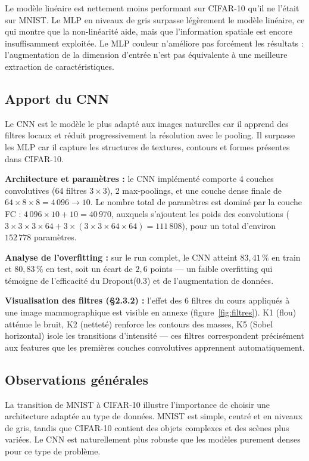 \documentclass[a4paper,10pt]{article}
\begin{document}
Le modèle linéaire est nettement moins performant sur CIFAR-10 qu'il ne l'était sur MNIST.
Le MLP en niveaux de gris surpasse légèrement le modèle linéaire, ce qui montre que
la non-linéarité aide, mais que l'information spatiale est encore insuffisamment exploitée.
Le MLP couleur n'améliore pas forcément les résultats : l'augmentation de la dimension
d'entrée n'est pas équivalente à une meilleure extraction de caractéristiques.

\subsection{Apport du CNN}

Le CNN est le modèle le plus adapté aux images naturelles car il apprend des filtres locaux
et réduit progressivement la résolution avec le pooling.
Il surpasse les MLP car il capture les structures de textures, contours et formes présentes dans CIFAR-10.

\textbf{Architecture et paramètres :} le CNN implémenté comporte 4 couches convolutives
(64 filtres $3\times3$), 2 max-poolings, et une couche dense finale de $64 \times 8 \times 8 = 4\,096 \to 10$.
Le nombre total de paramètres est dominé par la couche FC : $4\,096 \times 10 + 10 = 40\,970$,
auxquels s'ajoutent les poids des convolutions
($3 \times 3 \times 3 \times 64 + 3 \times (3 \times 3 \times 64 \times 64) = 111\,808$),
pour un total d'environ $152\,778$ paramètres.

\textbf{Analyse de l'overfitting :} sur le run complet,
le CNN atteint $83{,}41\,\%$ en train et $80{,}83\,\%$ en test,
soit un écart de $2{,}6$ points — un faible overfitting qui témoigne de l'efficacité
du Dropout(0.3) et de l'augmentation de données.

\textbf{Visualisation des filtres (§2.3.2) :} l'effet des 6 filtres du cours appliqués
à une image mammographique est visible en annexe (figure~\ref{fig:filtres}).
K1 (flou) atténue le bruit, K2 (netteté) renforce les contours des masses,
K5 (Sobel horizontal) isole les transitions d'intensité — ces filtres correspondent
précisément aux features que les premières couches convolutives apprennent automatiquement.

\subsection{Observations générales}

La transition de MNIST à CIFAR-10 illustre l'importance de choisir une architecture
adaptée au type de données.
MNIST est simple, centré et en niveaux de gris, tandis que CIFAR-10 contient des objets
complexes et des scènes plus variées.
Le CNN est naturellement plus robuste que les modèles purement denses pour ce type de problème.
\end{document}
